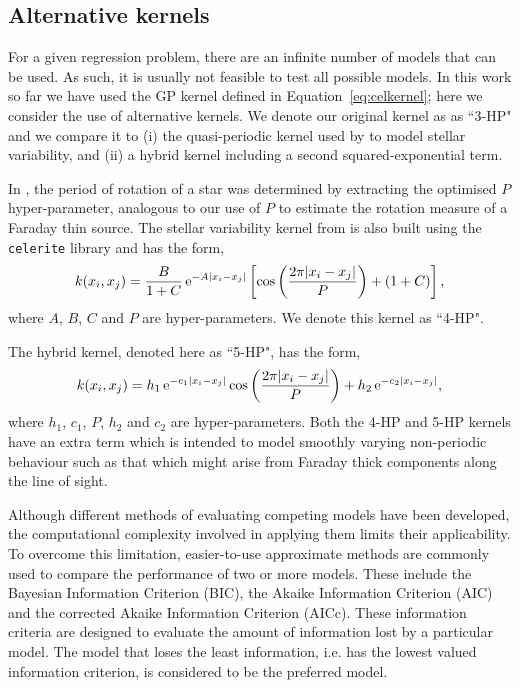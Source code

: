 \documentclass[fleqn,usenatbib]{mnras}
\begin{document}
\subsection{Alternative kernels}
\label{sec:infocrit}

For a given regression problem, there are an infinite number of models that can be used. As such, it is usually not feasible to test all possible models. In this work so far we have used the GP kernel defined in Equation~\ref{eq:celkernel}; here we consider the use of alternative kernels. We denote our original kernel as as ``3-HP" and we compare it to (i) the quasi-periodic kernel used by \cite{celerite} to model stellar variability, and (ii) a hybrid kernel including a second squared-exponential term.

In \cite{celerite}, the period of rotation of a star was determined by extracting the optimised $P$ hyper-parameter, analogous to our use of $P$ to estimate the rotation measure of a Faraday thin source. The stellar variability kernel from \cite{celerite} is also built using the {\tt celerite} library and has the form,
%
\begin{equation}
\label{eq:4hpkernel}
k(x_i,x_j)=\frac{B}{1+C}\,{\rm e}^{-A|x_i - x_j|}\left[\cos\left(\frac{2\pi|x_i - x_j|}{P}\right) + (1+C)\right],
\end{equation}
%
where $A$, $B$, $C$ and $P$ are hyper-parameters. We denote this kernel as ``4-HP".

The hybrid kernel, denoted here as ``5-HP", has the form,
%
\begin{equation}
\label{eq:5hpkernel}
k(x_i,x_j)=h_1\,{\rm e}^{-c_1|x_i - x_j|}\cos\left(\frac{2\pi|x_i - x_j|}{P}\right) + h_2\,{\rm e}^{-c_2|x_i - x_j|},
\end{equation}
%
where $h_1$, $c_1$, $P$, $h_2$ and $c_2$ are hyper-parameters. Both the 4-HP and 5-HP kernels have an extra term which is intended to model smoothly varying non-periodic behaviour such as that which might arise from Faraday thick components along the line of sight.

Although different methods of evaluating competing models have been developed, the computational complexity involved in applying them limits their applicability. To overcome this limitation, easier-to-use approximate methods are commonly used to compare the performance of two or more models. These include the Bayesian Information Criterion (BIC), the Akaike Information Criterion (AIC) and the corrected Akaike Information Criterion (AICc). These information criteria are designed to evaluate the amount of information lost by a particular model. The model that loses the least information, i.e. has the lowest valued information criterion, is considered to be the preferred model.
\end{document}
